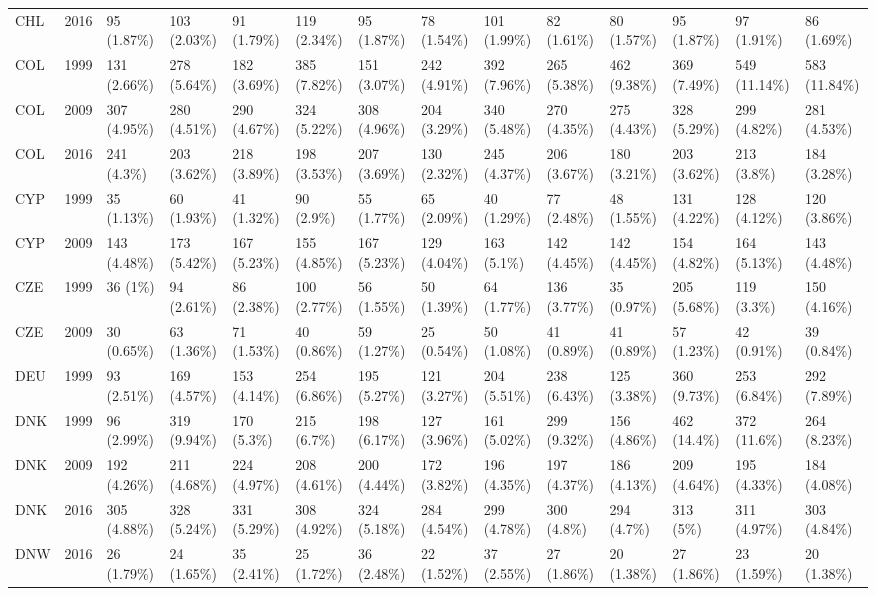\documentclass[]{article}
\begin{document}
\begin{longtable}[]{@{}lrllllllllllll@{}}
CHL & 2016 & 95 (1.87\%) & 103 (2.03\%) & 91 (1.79\%) & 119 (2.34\%) &
95 (1.87\%) & 78 (1.54\%) & 101 (1.99\%) & 82 (1.61\%) & 80 (1.57\%) &
95 (1.87\%) & 97 (1.91\%) & 86 (1.69\%)\tabularnewline
COL & 1999 & 131 (2.66\%) & 278 (5.64\%) & 182 (3.69\%) & 385 (7.82\%) &
151 (3.07\%) & 242 (4.91\%) & 392 (7.96\%) & 265 (5.38\%) & 462 (9.38\%)
& 369 (7.49\%) & 549 (11.14\%) & 583 (11.84\%)\tabularnewline
COL & 2009 & 307 (4.95\%) & 280 (4.51\%) & 290 (4.67\%) & 324 (5.22\%) &
308 (4.96\%) & 204 (3.29\%) & 340 (5.48\%) & 270 (4.35\%) & 275 (4.43\%)
& 328 (5.29\%) & 299 (4.82\%) & 281 (4.53\%)\tabularnewline
COL & 2016 & 241 (4.3\%) & 203 (3.62\%) & 218 (3.89\%) & 198 (3.53\%) &
207 (3.69\%) & 130 (2.32\%) & 245 (4.37\%) & 206 (3.67\%) & 180 (3.21\%)
& 203 (3.62\%) & 213 (3.8\%) & 184 (3.28\%)\tabularnewline
CYP & 1999 & 35 (1.13\%) & 60 (1.93\%) & 41 (1.32\%) & 90 (2.9\%) & 55
(1.77\%) & 65 (2.09\%) & 40 (1.29\%) & 77 (2.48\%) & 48 (1.55\%) & 131
(4.22\%) & 128 (4.12\%) & 120 (3.86\%)\tabularnewline
CYP & 2009 & 143 (4.48\%) & 173 (5.42\%) & 167 (5.23\%) & 155 (4.85\%) &
167 (5.23\%) & 129 (4.04\%) & 163 (5.1\%) & 142 (4.45\%) & 142 (4.45\%)
& 154 (4.82\%) & 164 (5.13\%) & 143 (4.48\%)\tabularnewline
CZE & 1999 & 36 (1\%) & 94 (2.61\%) & 86 (2.38\%) & 100 (2.77\%) & 56
(1.55\%) & 50 (1.39\%) & 64 (1.77\%) & 136 (3.77\%) & 35 (0.97\%) & 205
(5.68\%) & 119 (3.3\%) & 150 (4.16\%)\tabularnewline
CZE & 2009 & 30 (0.65\%) & 63 (1.36\%) & 71 (1.53\%) & 40 (0.86\%) & 59
(1.27\%) & 25 (0.54\%) & 50 (1.08\%) & 41 (0.89\%) & 41 (0.89\%) & 57
(1.23\%) & 42 (0.91\%) & 39 (0.84\%)\tabularnewline
DEU & 1999 & 93 (2.51\%) & 169 (4.57\%) & 153 (4.14\%) & 254 (6.86\%) &
195 (5.27\%) & 121 (3.27\%) & 204 (5.51\%) & 238 (6.43\%) & 125 (3.38\%)
& 360 (9.73\%) & 253 (6.84\%) & 292 (7.89\%)\tabularnewline
DNK & 1999 & 96 (2.99\%) & 319 (9.94\%) & 170 (5.3\%) & 215 (6.7\%) &
198 (6.17\%) & 127 (3.96\%) & 161 (5.02\%) & 299 (9.32\%) & 156 (4.86\%)
& 462 (14.4\%) & 372 (11.6\%) & 264 (8.23\%)\tabularnewline
DNK & 2009 & 192 (4.26\%) & 211 (4.68\%) & 224 (4.97\%) & 208 (4.61\%) &
200 (4.44\%) & 172 (3.82\%) & 196 (4.35\%) & 197 (4.37\%) & 186 (4.13\%)
& 209 (4.64\%) & 195 (4.33\%) & 184 (4.08\%)\tabularnewline
DNK & 2016 & 305 (4.88\%) & 328 (5.24\%) & 331 (5.29\%) & 308 (4.92\%) &
324 (5.18\%) & 284 (4.54\%) & 299 (4.78\%) & 300 (4.8\%) & 294 (4.7\%) &
313 (5\%) & 311 (4.97\%) & 303 (4.84\%)\tabularnewline
DNW & 2016 & 26 (1.79\%) & 24 (1.65\%) & 35 (2.41\%) & 25 (1.72\%) & 36
(2.48\%) & 22 (1.52\%) & 37 (2.55\%) & 27 (1.86\%) & 20 (1.38\%) & 27
(1.86\%) & 23 (1.59\%) & 20 (1.38\%)\tabularnewline

\end{longtable}
\end{document}
